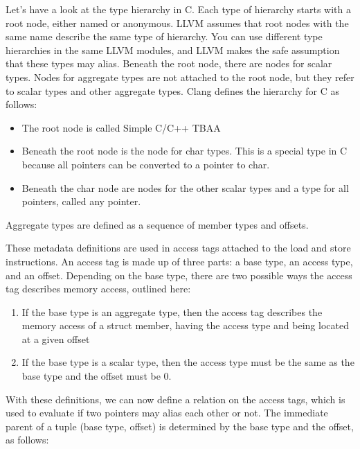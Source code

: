 Let's have a look at the type hierarchy in C. Each type of hierarchy starts with a root node, either named or anonymous. LLVM assumes that root nodes with the same name describe the same type of hierarchy. You can use different type hierarchies in the same LLVM modules, and LLVM makes the safe assumption that these types may alias. Beneath the root node, there are nodes for scalar types. Nodes for aggregate types are not attached to the root node, but they refer to scalar types and other aggregate types. Clang defines the hierarchy for C as follows:\par

\begin{itemize}
	\item The root node is called Simple C/C++ TBAA
	\item Beneath the root node is the node for char types. This is a special type in C because all pointers can be converted to a pointer to char.
	\item Beneath the char node are nodes for the other scalar types and a type for all pointers, called any pointer.
\end{itemize}

Aggregate types are defined as a sequence of member types and offsets.\par

These metadata definitions are used in access tags attached to the load and store instructions. An access tag is made up of three parts: a base type, an access type, and an offset. Depending on the base type, there are two possible ways the access tag describes memory access, outlined here:\par

\begin{enumerate}
	\item If the base type is an aggregate type, then the access tag describes the memory access of a struct member, having the access type and being located at a given offset
	\item If the base type is a scalar type, then the access type must be the same as the base type and the offset must be 0.
\end{enumerate}

With these definitions, we can now define a relation on the access tags, which is used to evaluate if two pointers may alias each other or not. The immediate parent of a tuple (base type, offset) is determined by the base type and the offset, as follows:\par

